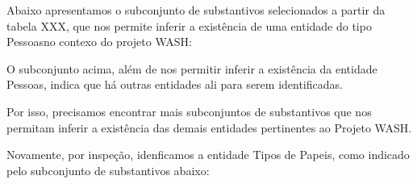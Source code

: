 \documentclass[
12pt,		%
openright,	%
twoside,  %
a4paper,			%
chapter=TITLE,		%
english,			%
french,				%
spanish,			%
brazil				%
]{USPSC-classe/USPSC}
\begin{document}
Abaixo apresentamos o subconjunto de substantivos selecionados a partir da tabela XXX, que nos permite inferir a exist\^encia de uma entidade do tipo \textquotedbl Pessoas\textquotedbl  no contexo do projeto WASH:















\noindent\begin{center}\mbox{\centering{}}\end{center}


O subconjunto acima, al\'em de nos permitir inferir a exist\^encia da entidade \textquotedbl Pessoas\textquotedbl , indica que h\'a outras entidades ali para serem identificadas.














Por isso, precisamos encontrar mais subconjuntos de substantivos que nos permitam inferir a exist\^encia  das demais entidades pertinentes ao Projeto WASH.














Novamente, por inspe\c{c}\~ao, idenficamos a entidade \textquotedbl Tipos de Papeis\textquotedbl , como indicado pelo subconjunto de substantivos abaixo:
\end{document}
